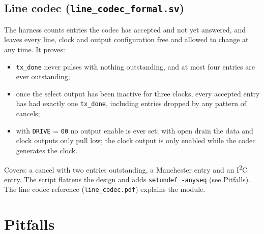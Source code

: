 \documentclass[11pt,a4paper]{article}
\newcommand{\file}[1]{\texttt{#1}}
\begin{document}
\subsection{Line codec (\file{line\_codec\_formal.sv})}
The harness counts entries the codec has accepted and not yet answered, and leaves every line, clock and output configuration free and allowed to change at any time. It proves:
\begin{itemize}
\item \texttt{tx\_done} never pulses with nothing outstanding, and at most four entries are ever outstanding;
\item once the select output has been inactive for three clocks, every accepted entry has had exactly one \texttt{tx\_done}, including entries dropped by any pattern of cancels;
\item with \texttt{DRIVE} = \texttt{00} no output enable is ever set; with open drain the data and clock outputs only pull low; the clock output is only enabled while the codec generates the clock.
\end{itemize}
Covers: a cancel with two entries outstanding, a Manchester entry and an I\textsuperscript{2}C entry. The script flattens the design and adds \texttt{setundef -anyseq} (see Pitfalls). The line codec reference (\file{line\_codec.pdf}) explains the module.

\section{Pitfalls}
\end{document}
